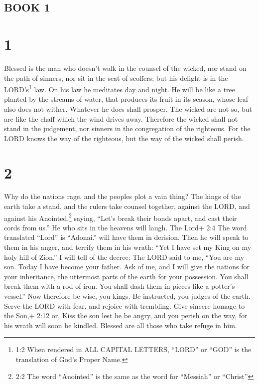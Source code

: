 \hypertarget{book-1}{%
\subsection{BOOK 1}\label{book-1}}

\hypertarget{section}{%
\section{1}\label{section}}

 Blessed is the man who doesn't walk in the counsel of the
wicked, nor stand on the path of sinners, nor sit in the seat of
scoffers;  but his delight is in the LORD's\footnote{1:2
  When rendered in ALL CAPITAL LETTERS, ``LORD'' or ``GOD'' is the
  translation of God's Proper Name.} law. On his law he meditates day
and night.  He will be like a tree planted by the streams of
water, that produces its fruit in its season, whose leaf also does not
wither. Whatever he does shall prosper.  The wicked are not
so, but are like the chaff which the wind drives away. 
Therefore the wicked shall not stand in the judgement, nor sinners in
the congregation of the righteous.  For the LORD knows the
way of the righteous, but the way of the wicked shall perish.

\hypertarget{section-1}{%
\section{2}\label{section-1}}

 Why do the nations rage, and the peoples plot a vain thing?
 The kings of the earth take a stand, and the rulers take
counsel together, against the LORD, and against his Anointed,\footnote{2:2
  The word ``Anointed'' is the same as the word for ``Messiah'' or
  ``Christ''} saying,  ``Let's break their bonds apart, and
cast their cords from us.''  He who sits in the heavens will
laugh. The Lord+ 2:4 The word translated ``Lord'' is ``Adonai.'' will
have them in derision.  Then he will speak to them in his
anger, and terrify them in his wrath:  ``Yet I have set my
King on my holy hill of Zion.''  I will tell of the decree:
The LORD said to me, ``You are my son. Today I have become your father.
 Ask of me, and I will give the nations for your
inheritance, the uttermost parts of the earth for your possession.
 You shall break them with a rod of iron. You shall dash
them in pieces like a potter's vessel.''  Now therefore be
wise, you kings. Be instructed, you judges of the earth. 
Serve the LORD with fear, and rejoice with trembling.  Give
sincere homage to the Son,+ 2:12 or, Kiss the son lest he be angry, and
you perish on the way, for his wrath will soon be kindled. Blessed are
all those who take refuge in him.


